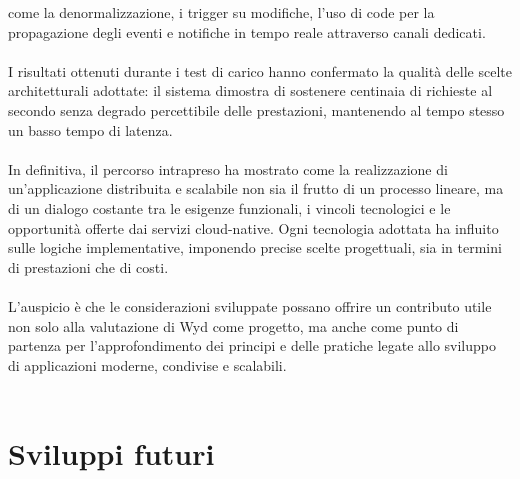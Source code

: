 come la denormalizzazione, i trigger su modifiche, 
l'uso di code per la propagazione degli eventi e 
notifiche in tempo reale attraverso canali dedicati.\\
\\
I risultati ottenuti durante i test di carico hanno confermato 
la qualità delle scelte architetturali adottate: 
il sistema dimostra di sostenere centinaia di richieste al secondo 
senza degrado percettibile delle prestazioni, 
mantenendo al tempo stesso un basso tempo di latenza.\\
\\
In definitiva, il percorso intrapreso ha mostrato 
come la realizzazione di un'applicazione distribuita e scalabile 
non sia il frutto di un processo lineare, 
ma di un dialogo costante tra le esigenze funzionali, 
i vincoli tecnologici e le opportunità offerte dai servizi cloud-native. 
Ogni tecnologia adottata ha influito sulle logiche implementative, 
imponendo precise scelte progettuali, 
sia in termini di prestazioni che di costi.\\
\\
L'auspicio è che le considerazioni sviluppate 
possano offrire un contributo utile non solo alla valutazione di Wyd come progetto,
ma anche come punto di partenza per l'approfondimento dei principi e delle pratiche 
legate allo sviluppo di applicazioni moderne, condivise e scalabili.\\
\\
\section{Sviluppi futuri}

